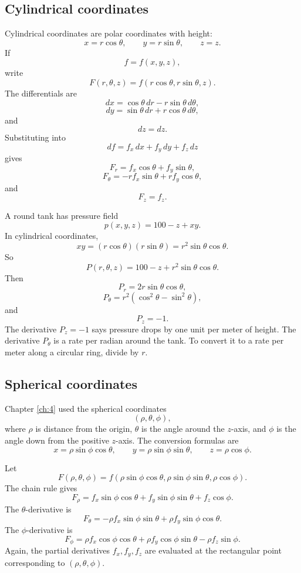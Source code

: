 \subsection{Cylindrical coordinates}

Cylindrical coordinates are polar coordinates with height:
\[
    x=r\cos\theta,
    \qquad
    y=r\sin\theta,
    \qquad
    z=z.
\]
If
\[
    f=f(x,y,z),
\]
write
\[
    F(r,\theta,z)=f(r\cos\theta,r\sin\theta,z).
\]
The differentials are
\[
    dx=\cos\theta\,dr-r\sin\theta\,d\theta,
\]
\[
    dy=\sin\theta\,dr+r\cos\theta\,d\theta,
\]
and
\[
    dz=dz.
\]
Substituting into
\[
    df=f_x\,dx+f_y\,dy+f_z\,dz
\]
gives
\[
\boxed{
    F_r=f_x\cos\theta+f_y\sin\theta,
}
\]
\[
\boxed{
    F_\theta=-r f_x\sin\theta+r f_y\cos\theta,
}
\]
and
\[
\boxed{
    F_z=f_z.
}
\]

\begin{example}
A round tank has pressure field
\[
    p(x,y,z)=100-z+xy.
\]
In cylindrical coordinates,
\[
    xy=(r\cos\theta)(r\sin\theta)=r^2\sin\theta\cos\theta.
\]
So
\[
    P(r,\theta,z)=100-z+r^2\sin\theta\cos\theta.
\]
Then
\[
    P_r=2r\sin\theta\cos\theta,
\]
\[
    P_\theta=r^2(\cos^2\theta-\sin^2\theta),
\]
and
\[
    P_z=-1.
\]
The derivative \(P_z=-1\) says pressure drops by one unit per meter of height.  The
derivative \(P_\theta\) is a rate per radian around the tank.  To convert it to a rate per
meter along a circular ring, divide by \(r\).
\end{example}

\subsection{Spherical coordinates}

Chapter \ref{ch:4} used the spherical coordinates
\[
    (\rho,\theta,\phi),
\]
where \(\rho\) is distance from the origin, \(\theta\) is the angle around the \(z\)-axis,
and \(\phi\) is the angle down from the positive \(z\)-axis.  The conversion formulas are
\[
\boxed{
    x=\rho\sin\phi\cos\theta,\qquad
    y=\rho\sin\phi\sin\theta,\qquad
    z=\rho\cos\phi.
}
\]

Let
\[
    F(\rho,\theta,\phi)
    =
    f(\rho\sin\phi\cos\theta,\rho\sin\phi\sin\theta,\rho\cos\phi).
\]
The chain rule gives
\[
\boxed{
F_\rho
=
f_x\sin\phi\cos\theta
+
f_y\sin\phi\sin\theta
+
f_z\cos\phi.
}
\]
The \(\theta\)-derivative is
\[
\boxed{
F_\theta
=
-\rho f_x\sin\phi\sin\theta
+
\rho f_y\sin\phi\cos\theta.
}
\]
The \(\phi\)-derivative is
\[
\boxed{
F_\phi
=
\rho f_x\cos\phi\cos\theta
+
\rho f_y\cos\phi\sin\theta
-
\rho f_z\sin\phi.
}
\]
Again, the partial derivatives \(f_x,f_y,f_z\) are evaluated at the rectangular point
corresponding to \((\rho,\theta,\phi)\).

